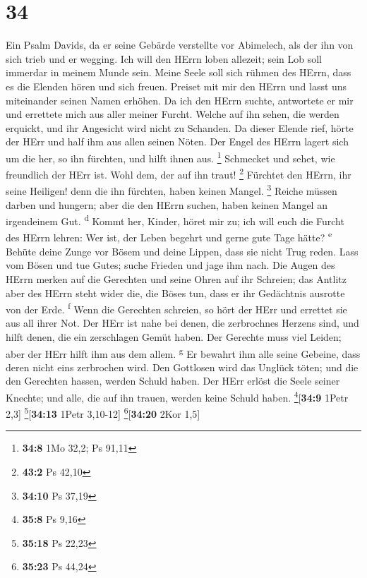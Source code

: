 \hypertarget{section-33}{%
\section{34}\label{section-33}}

 Ein Psalm Davids, da er seine Gebärde verstellte vor
Abimelech, als der ihn von sich trieb und er wegging.  Ich
will den HErrn loben allezeit; sein Lob soll immerdar in meinem Munde
sein.  Meine Seele soll sich rühmen des HErrn, dass es die
Elenden hören und sich freuen.  Preiset mit mir den HErrn
und lasst uns miteinander seinen Namen erhöhen.  Da ich
den HErrn suchte, antwortete er mir und errettete mich aus aller meiner
Furcht.  Welche auf ihn sehen, die werden erquickt, und
ihr Angesicht wird nicht zu Schanden.  Da dieser Elende
rief, hörte der HErr und half ihm aus allen seinen Nöten. 
Der Engel des HErrn lagert sich um die her, so ihn fürchten, und hilft
ihnen aus. \footnote{\textbf{34:8} 1Mo 32,2; Ps 91,11} 
Schmecket und sehet, wie freundlich der HErr ist. Wohl dem, der auf ihn
traut! \footnote{\textbf{43:2} Ps 42,10}  Fürchtet den
HErrn, ihr seine Heiligen! denn die ihn fürchten, haben keinen Mangel.
\footnote{\textbf{34:10} Ps 37,19}  Reiche müssen darben
und hungern; aber die den HErrn suchen, haben keinen Mangel an
irgendeinem Gut. \textsuperscript{d}  Kommt her, Kinder,
höret mir zu; ich will euch die Furcht des HErrn lehren: 
Wer ist, der Leben begehrt und gerne gute Tage hätte?
\textsuperscript{e}  Behüte deine Zunge vor Bösem und
deine Lippen, dass sie nicht Trug reden.  Lass vom Bösen
und tue Gutes; suche Frieden und jage ihm nach.  Die
Augen des HErrn merken auf die Gerechten und seine Ohren auf ihr
Schreien;  das Antlitz aber des HErrn steht wider die,
die Böses tun, dass er ihr Gedächtnis ausrotte von der Erde.
\textsuperscript{f}  Wenn die Gerechten schreien, so hört
der HErr und errettet sie aus all ihrer Not.  Der HErr
ist nahe bei denen, die zerbrochnes Herzens sind, und hilft denen, die
ein zerschlagen Gemüt haben.  Der Gerechte muss viel
Leiden; aber der HErr hilft ihm aus dem allem. \textsuperscript{g}
 Er bewahrt ihm alle seine Gebeine, dass deren nicht eins
zerbrochen wird.  Den Gottlosen wird das Unglück töten;
und die den Gerechten hassen, werden Schuld haben.  Der
HErr erlöst die Seele seiner Knechte; und alle, die auf ihn trauen,
werden keine Schuld haben. \footnote{\textbf{35:8} Ps 9,16}{[}\textbf{34:9}
1Petr 2,3{]} \footnote{\textbf{35:18} Ps 22,23}{[}\textbf{34:13} 1Petr
3,10-12{]} \footnote{\textbf{35:23} Ps 44,24}{[}\textbf{34:20} 2Kor
1,5{]}

